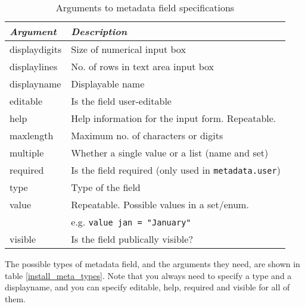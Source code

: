 \begin{table}
\begin{center}
\begin{tabular}{|l|l|}
\hline
\emph{Argument} & \emph{Description}                                       \\
\hline
displaydigits   & Size of numerical input box                              \\
displaylines    & No. of rows in text area input box                       \\
displayname     & Displayable name                                         \\
editable        & Is the field user-editable                               \\
help            & Help information for the input form. Repeatable.         \\
maxlength       & Maximum no. of characters or digits                      \\
multiple        & Whether a single value or a list (name and set)          \\
required        & Is the field required (only used in {\tt metadata.user}) \\
type            & Type of the field                                        \\
value           & Repeatable. Possible values in a set/enum.               \\
                & e.g. {\tt value jan = "January"}                         \\
visible         & Is the field publically visible?                         \\
\hline
\end{tabular}
\caption{\label{install_meta_args} Arguments to metadata field specifications}
\end{center}
\end{table}

The possible types of metadata field, and the arguments they need, are shown in table \ref{install_meta_types}. Note that you always need to specify a type and a displayname, and you can specify editable, help, required and visible for all of them.

